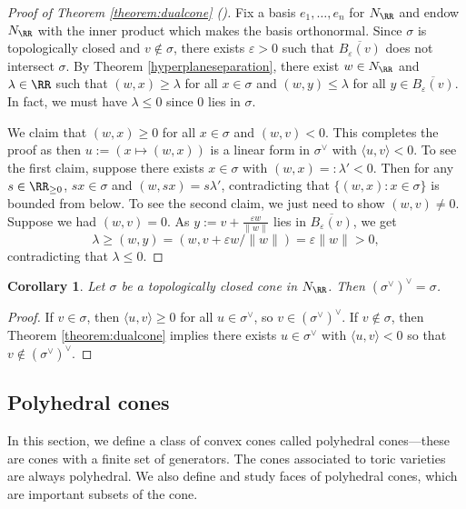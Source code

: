\documentclass[12pt]{amsart}
\theoremstyle{plain}
\newtheorem{corollary}[theorem]{Corollary}
\begin{document}
\begin{proof}[Proof of Theorem \ref{theorem:dualcone} \textup{(\cite[Example 2.20]{BV04})}]
Fix a basis $e_1, \ldots, e_n$ for $N_\RR$ and endow $N_\RR$ with the inner product which makes the basis orthonormal.
Since $\sigma$ is topologically closed and $v \notin \sigma$, there exists $\varepsilon > 0$ such that $\overline{B_\varepsilon(v)}$ does not intersect $\sigma$.
By Theorem \ref{hyperplaneseparation}, there exist $w \in N_\RR$ and $\lambda \in \RR$ such that $(w, x) \ge \lambda$ for all $x \in \sigma$ and $(w, y) \le \lambda$ for all $y \in \overline{B_\varepsilon(v)}$.
In fact, we must have $\lambda \le 0$ since $0$ lies in $\sigma$.

We claim that $(w, x) \ge 0$ for all $x \in \sigma$ and $(w, v) < 0$.
This completes the proof as then $u := (x \mapsto (w, x))$ is a linear form in $\sigma^\vee$ with $\langle u, v \rangle < 0$.
To see the first claim, suppose there exists $x \in \sigma$ with $(w, x) =: \lambda' < 0$.
Then for any $s \in \RR_{\ge 0}$, $s x \in \sigma $ and $(w, s x) = s \lambda'$, contradicting that $\{(w, x) : x \in \sigma\}$ is bounded from below.
To see the second claim, we just need to show $(w, v) \ne 0$.
Suppose we had $(w, v) = 0$.
As $y := v + \frac{\varepsilon w}{\|w\|}$ lies in $\overline{B_\varepsilon(v)}$, we get
$$\lambda \ge (w, y) = (w, v + \varepsilon w/\|w\|) = \varepsilon \|w\| > 0,$$
contradicting that $\lambda \le 0$.
\end{proof}

\begin{corollary}\label{corollary:doubledual}
Let $\sigma$ be a topologically closed cone in $N_\RR$.
Then $(\sigma^\vee)^\vee = \sigma$.
\end{corollary}
\begin{proof}
If $v \in \sigma$, then $\langle u, v\rangle \ge 0$ for all $u \in \sigma^\vee$, so $v \in (\sigma^\vee)^\vee$.
If $v \notin \sigma$, then Theorem \ref{theorem:dualcone} implies there exists $u \in \sigma^\vee$ with $\langle u, v \rangle < 0$ so that $v \notin (\sigma^\vee)^\vee$.
\end{proof}





\subsection{Polyhedral cones}\label{polyhedralcones}
In this section, we define a class of convex cones called polyhedral cones---these are cones with a finite set of generators.
The cones associated to toric varieties are always polyhedral.
We also define and study faces of polyhedral cones, which are important subsets of the cone.
\end{document}
